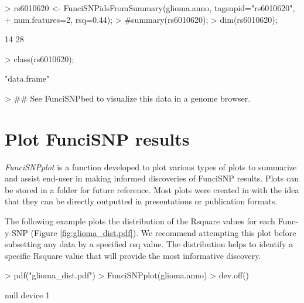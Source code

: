 \documentclass[12pt,fullpage]{article}
\newcommand{\Rmethod}[1]{{\textit{#1}}}
\begin{document}
\begin{Schunk}
\begin{Sinput}
> rs6010620 <- FunciSNPidsFromSummary(glioma.anno, tagsnpid="rs6010620",
+ num.features=2, rsq=0.44);
> #summary(rs6010620);
> dim(rs6010620);
\end{Sinput}
\begin{Soutput}
[1] 14 28
\end{Soutput}
\begin{Sinput}
> class(rs6010620);
\end{Sinput}
\begin{Soutput}
[1] "data.frame"
\end{Soutput}
\begin{Sinput}
> ## See FunciSNPbed to visualize this data in a genome browser.
\end{Sinput}
\end{Schunk}

\section{Plot FunciSNP results}

\Rmethod{FunciSNPplot} is a function developed to plot various types of plots to
summarize and assist end-user in making informed discoveries of FunciSNP
results. Plots can be stored in a folder for future reference. Most plots were
created in with the idea that they can be directly outputted in presentations or
publication formats.

The following example plots the distribution of the Rsquare values for each
Func-y-SNP (Figure \ref{fig:glioma_dist.pdf}). We recommend attempting this plot
before subsetting any data by a specified rsq value. The distribution helps to
identify a specific Rsquare value that will provide the most informative
discovery.

\begin{Schunk}
\begin{Sinput}
> pdf("glioma_dist.pdf")
> FunciSNPplot(glioma.anno)
> dev.off()
\end{Sinput}
\begin{Soutput}
null device 
          1 
\end{Soutput}
\end{Schunk}
\end{document}
